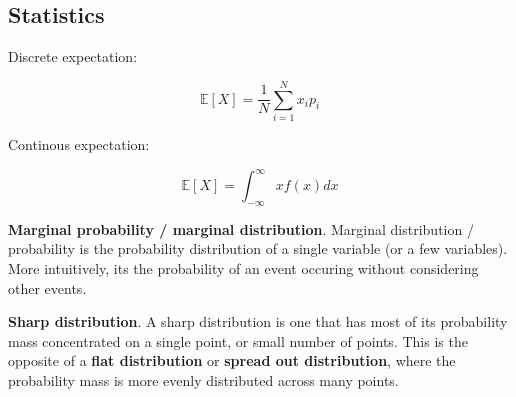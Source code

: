 \subsection{Statistics}
\label{appendix:statistics}

Discrete expectation:

\[ \mathbb{E}[X] = \frac{1}{N} \sum_{i=1}^{N} x_i p_i \]

Continous expectation:

\[ \mathbb{E}[X] = \int_{-\infty}^{\infty} x f(x) dx \]






\textbf{Marginal probability / marginal distribution}. Marginal distribution / probability is the probability distribution of a single variable (or a few variables). More intuitively, its the probability of an event occuring without considering other events.



\textbf{Sharp distribution}. A sharp distribution is one that has most of its probability mass concentrated on a single point, or small number of points. This is the opposite of a \textbf{flat distribution} or \textbf{spread out distribution}, where the probability mass is more evenly distributed across many points.